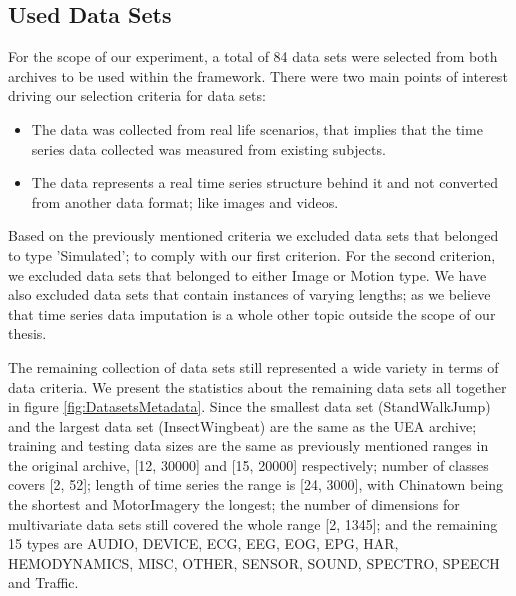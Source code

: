 \subsection{Used Data Sets}
\label{used data sets}
For the scope of our experiment, a total of 84 data sets were selected from both archives to be used within the framework.
There were two main points of interest driving our selection criteria for data sets:
\begin{itemize}
    \item The data was collected from real life scenarios, that implies that the time series data collected was measured from existing subjects.
    \item The data represents a real time series structure behind it and not converted from another data format; like images and videos.
\end{itemize}
Based on the previously mentioned criteria we excluded data sets that belonged to type 'Simulated'; to comply with our first criterion.
For the second criterion, we excluded data sets that belonged to either Image or Motion type.
We have also excluded data sets that contain instances of varying lengths; as we believe that time series data imputation is a whole other topic outside the scope of our thesis.

The remaining collection of data sets still represented a wide variety in terms of data criteria. We present the statistics about the remaining data sets all together in figure \ref{fig:DatasetsMetadata}.
Since the smallest data set (StandWalkJump) and the largest data set (InsectWingbeat) are the same as the UEA archive; training and testing data sizes are the same as previously mentioned ranges in the original archive, [12, 30000] and [15, 20000] respectively;
number of classes covers [2, 52]; length of time series the range is [24, 3000], with Chinatown being the shortest and MotorImagery the longest;
the number of dimensions for multivariate data sets still covered the whole range [2, 1345]; and the remaining 15 types are AUDIO, DEVICE, ECG, EEG, EOG, EPG, HAR, HEMODYNAMICS, MISC, OTHER, SENSOR, SOUND, SPECTRO, SPEECH and Traffic.

